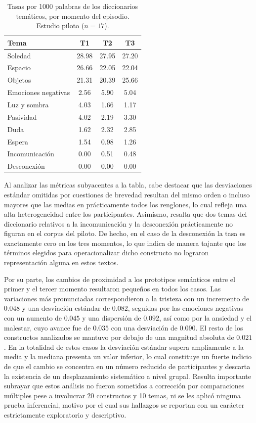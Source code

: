 \documentclass[12pt]{article}
\begin{document}
	\begin{table}[H]
		\centering
		\caption{Tasas por 1000 palabras de los diccionarios temáticos, por momento del episodio. Estudio piloto ($n = 17$).}
		\label{tab:temas_piloto}
		\begin{tabular}{l c c c}
			\toprule
			Tema & T1 & T2 & T3 \\
			\midrule
			Soledad              & 28.98 & 27.95 & 27.20 \\
			Espacio              & 26.66 & 22.05 & 22.04 \\
			Objetos              & 21.31 & 20.39 & 25.66 \\
			Emociones negativas  &  2.56 &  5.90 &  5.04 \\
			Luz y sombra         &  4.03 &  1.66 &  1.17 \\
			Pasividad            &  4.02 &  2.19 &  3.30 \\
			Duda                 &  1.62 &  2.32 &  2.85 \\
			Espera               &  1.54 &  0.98 &  1.26 \\
			Incomunicación       &  0.00 &  0.51 &  0.48 \\
			Desconexión          &  0.00 &  0.00 &  0.00 \\
			\bottomrule
		\end{tabular}
	\end{table}
	
	Al analizar las métricas subyacentes a la tabla, cabe destacar que las desviaciones estándar omitidas por cuestiones de brevedad resultan del mismo orden o incluso mayores que las medias en prácticamente todos los renglones, lo cual refleja una alta heterogeneidad entre los participantes. Asimismo, resalta que dos temas del diccionario relativos a la incomunicación y la desconexión prácticamente no figuran en el corpus del piloto. De hecho, en el caso de la desconexión la tasa es exactamente cero en los tres momentos, lo que indica de manera tajante que los términos elegidos para operacionalizar dicho constructo no lograron representación alguna en estos textos.
	
	Por su parte, los cambios de proximidad a los prototipos semánticos entre el primer y el tercer momento resultaron pequeños en todos los casos. Las variaciones más pronunciadas correspondieron a la tristeza con un incremento de $0.048$ y una desviación estándar de $0.082$, seguidas por las emociones negativas con un aumento de $0.045$ y una dispersión de $0.092$, así como por la ansiedad y el malestar, cuyo avance fue de $0.035$ con una desviación de $0.090$. El resto de los constructos analizados se mantuvo por debajo de una magnitud absoluta de $0.021$. En la totalidad de estos casos la desviación estándar supera ampliamente a la media y la mediana presenta un valor inferior, lo cual constituye un fuerte indicio de que el cambio se concentra en un número reducido de participantes y descarta la existencia de un desplazamiento sistemático a nivel grupal. Resulta importante subrayar que estos análisis no fueron sometidos a corrección por comparaciones múltiples pese a involucrar 20 constructos y 10 temas, ni se les aplicó ninguna prueba inferencial, motivo por el cual sus hallazgos se reportan con un carácter estrictamente exploratorio y descriptivo.
	
\end{document}
